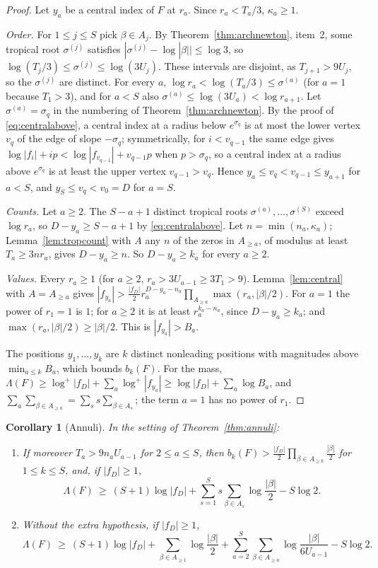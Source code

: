 \documentclass[11pt]{article}
\newtheorem{corollary}[theorem]{Corollary}
\begin{document}
\begin{proof}
Let $y_a$ be a central index of $F$ at $r_a$.  Since $r_a<T_a/3$,
$\kappa_a\ge1$.

\emph{Order.}  For $1\le j\le S$ pick $\beta\in A_j$.  By
Theorem~\ref{thm:archnewton}, item~2, some tropical root $\sigma^{(j)}$
satisfies $|\sigma^{(j)}-\log|\beta||\le\log3$, so
$\log(T_j/3)\le\sigma^{(j)}\le\log(3U_j)$.  These intervals are disjoint, as
$T_{j+1}>9U_j$, so the $\sigma^{(j)}$ are distinct.  For every $a$,
$\log r_a<\log(T_a/3)\le\sigma^{(a)}$ (for $a=1$ because $T_1>3$), and for
$a<S$ also $\sigma^{(a)}\le\log(3U_a)<\log r_{a+1}$.  Let
$\sigma^{(a)}=\sigma_q$ in the numbering of Theorem~\ref{thm:archnewton}.  By the
proof of \eqref{eq:centralabove}, a central index at a
radius below $e^{\sigma_q}$ is at most the lower vertex $v_q$ of the edge of
slope $-\sigma_q$; symmetrically, for $i<v_{q-1}$ the same edge gives
$\log|f_i|+ip<\log|f_{v_{q-1}}|+v_{q-1}p$ when $p>\sigma_q$, so a central
index at a radius above $e^{\sigma_q}$ is at least the upper vertex
$v_{q-1}>v_q$.  Hence $y_a\le v_q<v_{q-1}\le y_{a+1}$ for $a<S$, and
$y_S\le v_q<v_0=D$ for $a=S$.

\emph{Counts.}  Let $a\ge2$.  The $S-a+1$ distinct tropical roots
$\sigma^{(a)},\ldots,\sigma^{(S)}$ exceed $\log r_a$, so
$D-y_a\ge S-a+1$ by \eqref{eq:centralabove}.  Let $n=\min(n_a,\kappa_a)$;
Lemma~\ref{lem:tropcount} with $A$ any $n$ of the zeros in $A_{\ge a}$, of
modulus at least $T_a\ge3nr_a$, gives $D-y_a\ge n$.  So $D-y_a\ge k_a$ for every $a\ge2$.

\emph{Values.}  Every $r_a\ge1$ (for $a\ge2$, $r_a>3U_{a-1}\ge3T_1>9$).
Lemma~\ref{lem:central} with $A=A_{\ge a}$ gives
$|f_{y_a}|>\frac{|f_D|}2r_a^{D-y_a-n_a}\prod_{A_{\ge a}}\max(r_a,|\beta|/2)$.
For $a=1$ the power of $r_1=1$ is $1$; for $a\ge2$ it is at least
$r_a^{k_a-n_a}$, since $D-y_a\ge k_a$; and $\max(r_a,|\beta|/2)\ge|\beta|/2$.
This is $|f_{y_a}|>B_a$.

The positions $y_1,\ldots,y_k$ are $k$ distinct nonleading positions with
magnitudes above $\min_{a\le k}B_a$, which bounds $b_k(F)$.  For the mass,
$\Lambda(F)\ge\log^+|f_D|+\sum_a\log^+|f_{y_a}|\ge\log|f_D|+\sum_a\log B_a$,
and $\sum_a\sum_{\beta\in A_{\ge a}}=\sum_ss\sum_{\beta\in A_s}$; the term
$a=1$ has no power of $r_1$.
\end{proof}

\begin{corollary}[Annuli]\label{cor:annuli}
In the setting of Theorem~\ref{thm:annuli}:
\begin{enumerate}
\item If moreover $T_a>9n_aU_{a-1}$ for $2\le a\le S$, then
$b_k(F)>\frac{|f_D|}2\prod_{\beta\in A_{\ge k}}\frac{|\beta|}2$ for $1\le k\le S$,
and, if $|f_D|\ge1$,
\[
  \Lambda(F)\ \ge\ (S+1)\log|f_D|+\sum_{s=1}^Ss\sum_{\beta\in A_s}\log\frac{|\beta|}2-S\log2 .
\]
\item Without the extra hypothesis, if $|f_D|\ge1$,
\[
  \Lambda(F)\ \ge\ (S+1)\log|f_D|+\sum_{\beta\in A_{\ge1}}\log\frac{|\beta|}2
  +\sum_{a=2}^S\sum_{\beta\in A_{\ge a}}\log\frac{|\beta|}{6U_{a-1}}-S\log2 .
\]
\end{enumerate}
\end{corollary}
\end{document}
